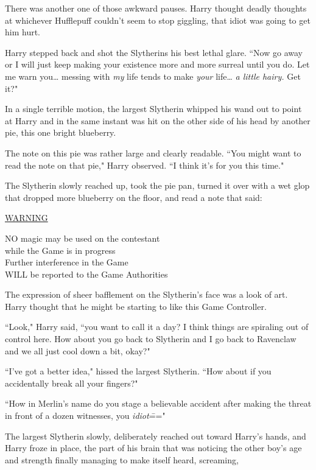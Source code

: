 There was another one of those awkward pauses. Harry thought deadly thoughts at whichever Hufflepuff couldn't seem to stop giggling, that idiot was going to get him hurt.

Harry stepped back and shot the Slytherins his best lethal glare. ``Now go away or I will just keep making your existence more and more surreal until you do. Let me warn you{\ldots} messing with \emph{my} life tends to make \emph{your} life{\ldots} \emph{a little hairy.} Get it?"

In a single terrible motion, the largest Slytherin whipped his wand out to point at Harry and in the same instant was hit on the other side of his head by another pie, this one bright blueberry.

The note on this pie was rather large and clearly readable. ``You might want to read the note on that pie," Harry observed. ``I think it's for you this time."

The Slytherin slowly reached up, took the pie pan, turned it over with a wet glop that dropped more blueberry on the floor, and read a note that said:

\begin{writtenNote}
\begin{samepage}
\MakeUppercase{\underline{Warning}}\nopagebreak[4]

\MakeUppercase{No} magic may be used on the contestant\\
while the Game is in progress\\
Further interference in the Game\\
\MakeUppercase{will} be reported to the Game Authorities
\end{samepage}
\end{writtenNote}

The expression of sheer bafflement on the Slytherin's face was a look of art. Harry thought that he might be starting to like this Game Controller.

``Look," Harry said, ``you want to call it a day? I think things are spiraling out of control here. How about you go back to Slytherin and I go back to Ravenclaw and we all just cool down a bit, okay?"

``I've got a better idea," hissed the largest Slytherin. ``How about if you accidentally break all your fingers?"

``How in Merlin's name do you stage a believable accident after making the threat in front of a dozen witnesses, you \emph{idiot}\==="

The largest Slytherin slowly, deliberately reached out toward Harry's hands, and Harry froze in place, the part of his brain that was noticing the other boy's age and strength finally managing to make itself heard, screaming, 

